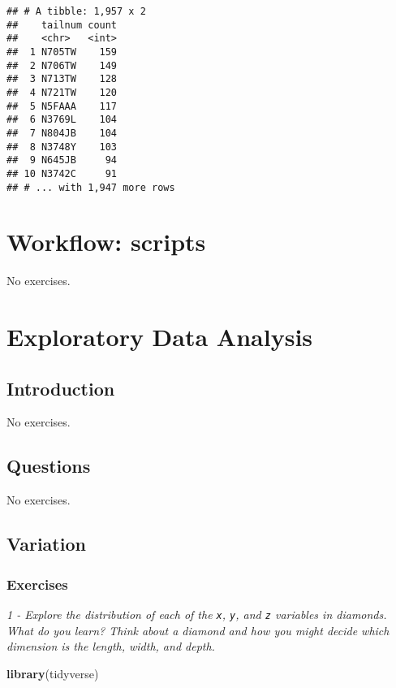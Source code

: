 \documentclass[]{article}
\newenvironment{Shaded}{\begin{snugshade}}{\end{snugshade}}
\newcommand{\KeywordTok}[1]{\textcolor[rgb]{0.13,0.29,0.53}{\textbf{#1}}}
\newcommand{\NormalTok}[1]{#1}
\theoremstyle{definition}
\theoremstyle{definition}
\theoremstyle{definition}
\theoremstyle{remark}
\begin{document}
\begin{verbatim}
## # A tibble: 1,957 x 2
##    tailnum count
##    <chr>   <int>
##  1 N705TW    159
##  2 N706TW    149
##  3 N713TW    128
##  4 N721TW    120
##  5 N5FAAA    117
##  6 N3769L    104
##  7 N804JB    104
##  8 N3748Y    103
##  9 N645JB     94
## 10 N3742C     91
## # ... with 1,947 more rows
\end{verbatim}

\section{Workflow: scripts}\label{workflow-scripts}

No exercises.

\section{Exploratory Data Analysis}\label{exploratory-data-analysis}

\subsection{Introduction}\label{introduction-4}

No exercises.

\subsection{Questions}\label{questions}

No exercises.

\subsection{Variation}\label{variation}

\subsubsection{Exercises}\label{exercises-13}

\emph{1 - Explore the distribution of each of the \texttt{x},
\texttt{y}, and \texttt{z} variables in diamonds. What do you learn?
Think about a diamond and how you might decide which dimension is the
length, width, and depth.}

\begin{Shaded}
\begin{Highlighting}[]
\KeywordTok{library}\NormalTok{(tidyverse)}
\end{Highlighting}
\end{Shaded}
\end{document}
